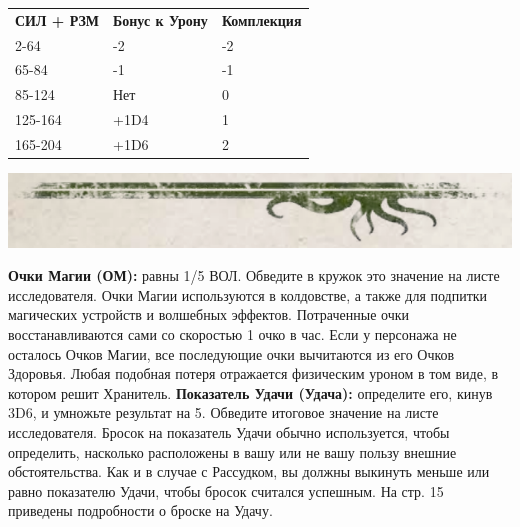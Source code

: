 \documentclass[letterpaper,twocolumn,openany, twoside, 11pt, usenames]{cocbook}
\begin{document}
\smallbreak
\begin{cocpaperbox}{}{}
  \noindent {}
  \bigbreak
  \begin{tabularx}{74mm}{@{}YYY@{}}
  \color{CoCPaperBox}\bfseries СИЛ + РЗМ & \color{CoCPaperBox}\bfseries Бонус к Урону & \color{CoCPaperBox}\bfseries Комплекция \\
  2-64 & -2 & -2 \\
  65-84 & -1 & -1 \\
  85-124 & Нет & 0 \\
  125-164 & +1D4 & 1 \\
  165-204 & +1D6 & 2 \\
  \end{tabularx}
  \includegraphics[width=\linewidth]{img/bottom.png}
\end{cocpaperbox}
\noindent \textbf{Очки Магии (ОМ):} равны 1/5 ВОЛ. Обведите в кружок это значение на листе исследователя. Очки Магии используются в колдовстве, а также для подпитки магических устройств и волшебных эффектов. Потраченные очки восстанавливаются сами со скоростью 1 очко в час. Если у персонажа не осталось Очков Магии, все последующие очки вычитаются из его Очков Здоровья. Любая подобная потеря отражается физическим уроном в том виде, в котором решит Хранитель.
\smallbreak
\noindent {}
\smallbreak
\noindent \textbf{Показатель Удачи (Удача):} определите его, кинув 3D6, и умножьте результат на 5. Обведите итоговое значение на листе исследователя. Бросок на показатель Удачи обычно используется, чтобы определить, насколько расположены в вашу или не вашу пользу внешние обстоятельства. Как и в случае с Рассудком, вы должны выкинуть меньше или равно показателю Удачи, чтобы бросок считался успешным. На стр. 15 приведены подробности о броске на Удачу.
\smallbreak
\noindent {}
\end{document}
